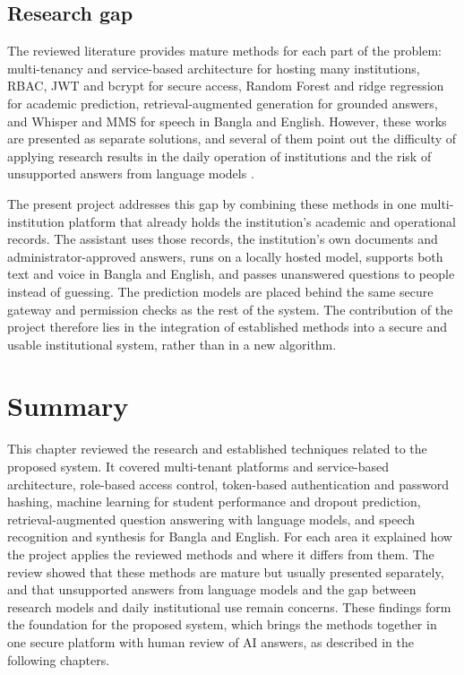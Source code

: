\subsection{Research gap}
The reviewed literature provides mature methods for each part of the problem: multi-tenancy and service-based architecture for hosting many institutions, RBAC, JWT and bcrypt for secure access, Random Forest and ridge regression for academic prediction, retrieval-augmented generation for grounded answers, and Whisper and MMS for speech in Bangla and English. However, these works are presented as separate solutions, and several of them point out the difficulty of applying research results in the daily operation of institutions \cite{romero2010edm} and the risk of unsupported answers from language models \cite{ji2023hallucination}.

The present project addresses this gap by combining these methods in one multi-institution platform that already holds the institution's academic and operational records. The assistant uses those records, the institution's own documents and administrator-approved answers, runs on a locally hosted model, supports both text and voice in Bangla and English, and passes unanswered questions to people instead of guessing. The prediction models are placed behind the same secure gateway and permission checks as the rest of the system. The contribution of the project therefore lies in the integration of established methods into a secure and usable institutional system, rather than in a new algorithm.

\section{Summary}
This chapter reviewed the research and established techniques related to the proposed system. It covered multi-tenant platforms and service-based architecture, role-based access control, token-based authentication and password hashing, machine learning for student performance and dropout prediction, retrieval-augmented question answering with language models, and speech recognition and synthesis for Bangla and English. For each area it explained how the project applies the reviewed methods and where it differs from them. The review showed that these methods are mature but usually presented separately, and that unsupported answers from language models and the gap between research models and daily institutional use remain concerns. These findings form the foundation for the proposed system, which brings the methods together in one secure platform with human review of AI answers, as described in the following chapters.
